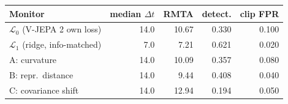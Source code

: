 \begin{tabular}{lrrrr}
\toprule
Monitor & median $\Delta t$ & RMTA & detect. & clip FPR \\
\midrule
$\mathcal{L}_0$ (V-JEPA 2 own loss) & 14.0 & 10.67 & 0.330 & 0.100 \\
$\mathcal{L}_1$ (ridge, info-matched) & 7.0 & 7.21 & 0.621 & 0.020 \\
\midrule
$\mathrm{A}$: curvature & 14.0 & 10.09 & 0.357 & 0.080 \\
$\mathrm{B}$: repr.\ distance & 14.0 & 9.44 & 0.408 & 0.040 \\
$\mathrm{C}$: covariance shift & 14.0 & 12.94 & 0.194 & 0.050 \\
\bottomrule
\end{tabular}
